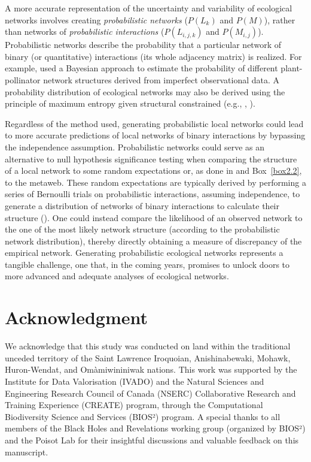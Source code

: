 A more accurate representation of the uncertainty and variability of ecological
networks involves creating \textit{probabilistic networks} ($P(L_k)$ and $P(M)$),
rather than networks of \textit{probabilistic interactions} ($P(L_{i, j, k})$ and
$P(M_{i, j})$). Probabilistic networks describe the probability that a
particular network of binary (or quantitative) interactions (its whole adjacency
matrix) is realized. For example, \cite{Young2021Reconstruction} used a Bayesian
approach to estimate the probability of different plant-pollinator network
structures derived from imperfect observational data. A probability distribution
of ecological networks may also be derived using the principle of maximum
entropy given structural constrained (e.g., \cite{Cimini2019Statistical},
\cite{Park2004Statistical}). 

Regardless of the method used, generating probabilistic local networks could
lead to more accurate predictions of local networks of binary interactions by
bypassing the independence assumption. Probabilistic networks could serve as an
alternative to null hypothesis significance testing when comparing the structure
of a local network to some random expectations or, as done in
\cite{Pellissier2018Comparing} and Box~\ref{box2.2}, to the metaweb. These random
expectations are typically derived by performing a series of Bernoulli trials on
probabilistic interactions, assuming independence, to generate a distribution of
networks of binary interactions to calculate their structure
(\cite{Poisot2016Structure}). One could instead compare the likelihood of an
observed network to the one of the most likely network structure (according to
the probabilistic network distribution), thereby directly obtaining a measure of
discrepancy of the empirical network. Generating probabilistic ecological
networks represents a tangible challenge, one that, in the coming years,
promises to unlock doors to more advanced and adequate analyses of ecological
networks.

\section{Acknowledgment} 

We acknowledge that this study was conducted on land within the traditional
unceded territory of the Saint Lawrence Iroquoian, Anishinabewaki, Mohawk,
Huron-Wendat, and Omàmiwininiwak nations. This work was supported by the
Institute for Data Valorisation (IVADO) and the Natural Sciences and Engineering
Research Council of Canada (NSERC) Collaborative Research and Training
Experience (CREATE) program, through the Computational Biodiversity Science and
Services (BIOS²) program. A special thanks to all members of the Black Holes and
Revelations working group (organized by BIOS²) and the Poisot Lab for their
insightful discussions and valuable feedback on this manuscript.

